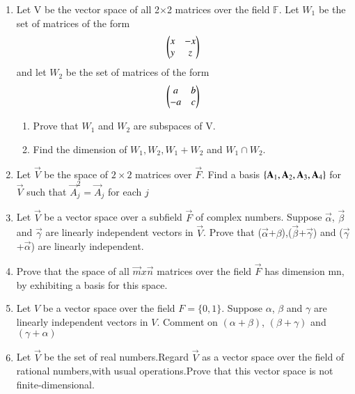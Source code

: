 \begin{enumerate}[label=\thesubsection.\arabic*.,ref=\thesubsection.\theenumi]
%
\\
\solution

\item Let V be the vector space of all 2$\times$2 matrices over the field $\mathbb{F}$. Let $W_1$ be the set of matrices of the form 
\begin{align}
    \begin{pmatrix}x&-x\\y&z\end{pmatrix}
\end{align}
and let $W_2$ be the set of matrices of the form 
\begin{align}
    \begin{pmatrix}a&b\\-a&c\end{pmatrix}
\end{align}
%
\begin{enumerate}
    \item Prove that $W_1$ and $W_2$ are subspaces of V.
    \item Find the dimension of $W_1, W_2, W_1+W_2$ and $W_1\cap W_2$.
\end{enumerate}
%
\solution

%
\item Let $\vec{V}$ be the space of $2\times2$ matrices over $\vec{F}$. Find a basis $\left\{\mathbf{A}_1, \mathbf{A}_2, \mathbf{A}_3, \mathbf{A}_4\right\}$ for $\vec{V}$ such that $\vec{A}_j^2 = \vec{A}_j$ for each $j$
%
\\
\solution

%
\item    Let $\vec{V}$ be a vector space over a subfield $\vec{F}$ of complex numbers. Suppose $\vec{\alpha}$, $\vec{\beta}$ and $\vec{\gamma}$ are linearly independent vectors in $\vec{V}$. Prove that ($\vec{\alpha}$+$\beta$),($\vec{\beta}$+$\vec{\gamma}$) and ($\vec{\gamma}$+$\vec{\alpha}$) are linearly independent.
%
\\
\solution

%
\item Prove that the space of all $\vec{m} x \vec{n}$ matrices over the field $\vec{F}$ has dimension mn, by exhibiting a basis for this space. 
%
\\
\solution

%
\item Let $V$ be a vector space over the field $F = \{0,1\}$. Suppose $\alpha$, $\beta$ and $\gamma$ are linearly independent vectors in $V$. Comment on $(\alpha + \beta)$, $(\beta + \gamma)$ and $(\gamma + \alpha)$
%
\\
\solution

\item Let $\vec{V}$ be the set of real numbers.Regard  $\vec{V}$  as a vector space over the field of rational numbers,with usual operations.Prove that this vector space is not finite-dimensional.
\\
\solution

\end{enumerate}
